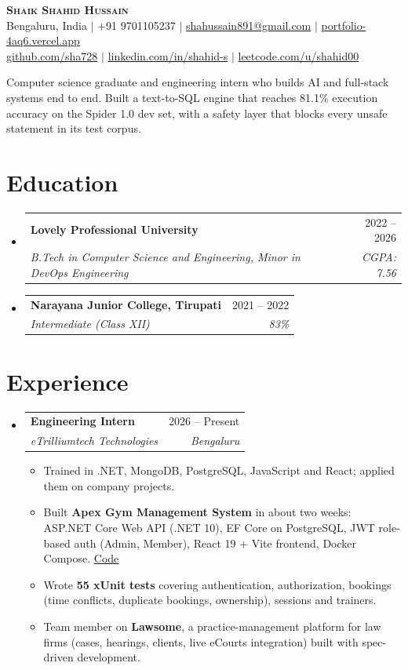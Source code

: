 \documentclass[letterpaper,10.5pt]{article}
\makeatletter
\newcommand{\resumeItem}[1]{\item\small{#1 \vspace{-2pt}}}
\newcommand{\resumeSubheading}[4]{
  \vspace{-2pt}\item
    \begin{tabular*}{0.98\textwidth}[t]{l@{\extracolsep{\fill}}r}
      \textbf{#1} & #2 \\
      \textit{\small#3} & \textit{\small #4} \\
    \end{tabular*}\vspace{-7pt}
}
\newcommand{\resumeSubHeadingListStart}{\begin{itemize}[leftmargin=0.15in, label={}]}
\newcommand{\resumeSubHeadingListEnd}{\end{itemize}}
\newcommand{\resumeItemListStart}{\begin{itemize}[leftmargin=0.18in]}
\newcommand{\resumeItemListEnd}{\end{itemize}\vspace{-5pt}}
\makeatother
\begin{document}
\begin{center}
    \textbf{\Huge \scshape Shaik Shahid Hussain} \\ \vspace{3pt}
    \small Bengaluru, India $|$ +91 9701105237 $|$
    \href{mailto:shahussain891@gmail.com}{shahussain891@gmail.com} $|$
    \href{https://portfolio-4aq6.vercel.app}{portfolio-4aq6.vercel.app} \\
    \href{https://github.com/sha728}{github.com/sha728} $|$
    \href{https://www.linkedin.com/in/shahid-s/}{linkedin.com/in/shahid-s} $|$
    \href{https://leetcode.com/u/shahid00/}{leetcode.com/u/shahid00}
\end{center}

\vspace{-6pt}
\small{Computer science graduate and engineering intern who builds AI and full-stack systems end to end. Built a text-to-SQL engine that reaches 81.1\% execution accuracy on the Spider 1.0 dev set, with a safety layer that blocks every unsafe statement in its test corpus.}

\section{Education}
  \resumeSubHeadingListStart
    \resumeSubheading
      {Lovely Professional University}{2022 -- 2026}
      {B.Tech in Computer Science and Engineering, Minor in DevOps Engineering}{CGPA: 7.56}
    \resumeSubheading
      {Narayana Junior College, Tirupati}{2021 -- 2022}
      {Intermediate (Class XII)}{83\%}
  \resumeSubHeadingListEnd

\section{Experience}
  \resumeSubHeadingListStart
    \resumeSubheading
      {Engineering Intern}{2026 -- Present}
      {eTrilliumtech Technologies}{Bengaluru}
      \resumeItemListStart
        \resumeItem{Trained in .NET, MongoDB, PostgreSQL, JavaScript and React; applied them on company projects.}
        \resumeItem{Built \textbf{Apex Gym Management System} in about two weeks: ASP.NET Core Web API (.NET 10), EF Core on PostgreSQL, JWT role-based auth (Admin, Member), React 19 + Vite frontend, Docker Compose. \href{https://github.com/sha728/gym-management-system}{\underline{Code}}}
        \resumeItem{Wrote \textbf{55 xUnit tests} covering authentication, authorization, bookings (time conflicts, duplicate bookings, ownership), sessions and trainers.}
        \resumeItem{Team member on \textbf{Lawsome}, a practice-management platform for law firms (cases, hearings, clients, live eCourts integration) built with spec-driven development.}
      \resumeItemListEnd
  \resumeSubHeadingListEnd
\end{document}
